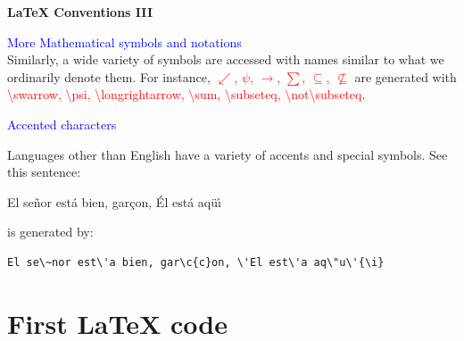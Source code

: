 \documentclass[xcolor=dvipsnames]{beamer}
\begin{document}
\begin{frame}[fragile]{\textbf{\LaTeX{} Conventions III}}

\textcolor{blue}{More Mathematical symbols and notations}\\
\vspace{0.2cm}
\justifying
Similarly, a wide variety of symbols are accessed with names similar to what we ordinarily
denote them. For instance, \textcolor{red}{$\swarrow$, $\psi$,
$\longrightarrow$, $\sum$, $\subseteq$, $\not\subseteq$} are generated with \textcolor{red}{\textbackslash swarrow, \textbackslash psi,
\textbackslash longrightarrow, \textbackslash sum, \textbackslash subseteq, \textbackslash not\textbackslash subseteq}.\\
\vspace{0.2cm}

\textcolor{blue}{Accented characters}\\

\vspace{0.2cm}

Languages other than English have a variety of accents and special symbols. See this sentence:
\begin{center}
El se\~nor est\'a bien, gar\c{c}on, \'El est\'a aq\"u\'{\i}
\end{center}


is generated by:\\

\vspace{0.2cm}

\begin{minipage}{11.1cm}
\small
\begin{Verbatim}[frame=single]
El se\~nor est\'a bien, gar\c{c}on, \'El est\'a aq\"u\'{\i}
\end{Verbatim}
\end{minipage}


\end{frame}


\section{First \LaTeX{} code}
\end{document}
